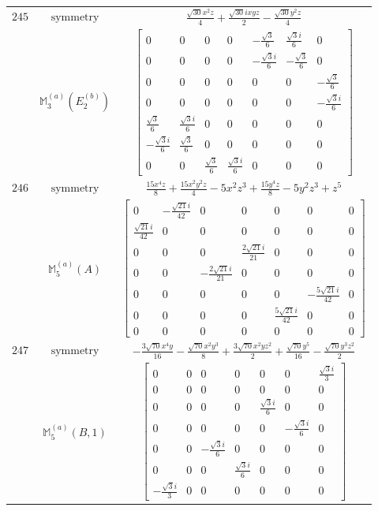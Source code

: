 \documentclass[fleqn,8pt,landscape]{jsarticle}
\begin{document}
\begin{longtable}{ccc}
$ 245 $ & $ \text{symmetry} $ & $ \frac{\sqrt{30} x^{2} z}{4} + \frac{\sqrt{30} i x y z}{2} - \frac{\sqrt{30} y^{2} z}{4} $ \\
$  $ & $ \mathbb{M}_{3}^{(a)}(E_{2}^{(b)}) $ & $ \begin{bmatrix} 0 & 0 & 0 & 0 & - \frac{\sqrt{3}}{6} & \frac{\sqrt{3} i}{6} & 0 \\ 0 & 0 & 0 & 0 & - \frac{\sqrt{3} i}{6} & - \frac{\sqrt{3}}{6} & 0 \\ 0 & 0 & 0 & 0 & 0 & 0 & - \frac{\sqrt{3}}{6} \\ 0 & 0 & 0 & 0 & 0 & 0 & - \frac{\sqrt{3} i}{6} \\ \frac{\sqrt{3}}{6} & \frac{\sqrt{3} i}{6} & 0 & 0 & 0 & 0 & 0 \\ - \frac{\sqrt{3} i}{6} & \frac{\sqrt{3}}{6} & 0 & 0 & 0 & 0 & 0 \\ 0 & 0 & \frac{\sqrt{3}}{6} & \frac{\sqrt{3} i}{6} & 0 & 0 & 0 \end{bmatrix} $ \\ \hline
$ 246 $ & $ \text{symmetry} $ & $ \frac{15 x^{4} z}{8} + \frac{15 x^{2} y^{2} z}{4} - 5 x^{2} z^{3} + \frac{15 y^{4} z}{8} - 5 y^{2} z^{3} + z^{5} $ \\
$  $ & $ \mathbb{M}_{5}^{(a)}(A) $ & $ \begin{bmatrix} 0 & - \frac{\sqrt{21} i}{42} & 0 & 0 & 0 & 0 & 0 \\ \frac{\sqrt{21} i}{42} & 0 & 0 & 0 & 0 & 0 & 0 \\ 0 & 0 & 0 & \frac{2 \sqrt{21} i}{21} & 0 & 0 & 0 \\ 0 & 0 & - \frac{2 \sqrt{21} i}{21} & 0 & 0 & 0 & 0 \\ 0 & 0 & 0 & 0 & 0 & - \frac{5 \sqrt{21} i}{42} & 0 \\ 0 & 0 & 0 & 0 & \frac{5 \sqrt{21} i}{42} & 0 & 0 \\ 0 & 0 & 0 & 0 & 0 & 0 & 0 \end{bmatrix} $ \\ \hline
$ 247 $ & $ \text{symmetry} $ & $ - \frac{3 \sqrt{70} x^{4} y}{16} - \frac{\sqrt{70} x^{2} y^{3}}{8} + \frac{3 \sqrt{70} x^{2} y z^{2}}{2} + \frac{\sqrt{70} y^{5}}{16} - \frac{\sqrt{70} y^{3} z^{2}}{2} $ \\
$  $ & $ \mathbb{M}_{5}^{(a)}(B,1) $ & $ \begin{bmatrix} 0 & 0 & 0 & 0 & 0 & 0 & \frac{\sqrt{3} i}{3} \\ 0 & 0 & 0 & 0 & 0 & 0 & 0 \\ 0 & 0 & 0 & 0 & \frac{\sqrt{3} i}{6} & 0 & 0 \\ 0 & 0 & 0 & 0 & 0 & - \frac{\sqrt{3} i}{6} & 0 \\ 0 & 0 & - \frac{\sqrt{3} i}{6} & 0 & 0 & 0 & 0 \\ 0 & 0 & 0 & \frac{\sqrt{3} i}{6} & 0 & 0 & 0 \\ - \frac{\sqrt{3} i}{3} & 0 & 0 & 0 & 0 & 0 & 0 \end{bmatrix} $ \\ \hline

\end{longtable}
\end{document}
